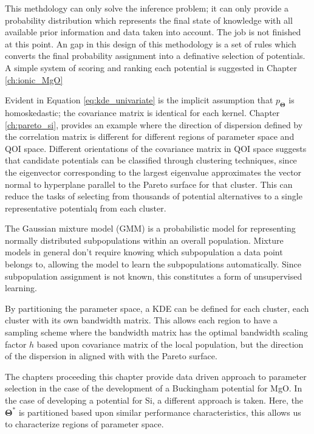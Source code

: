 This methdology can only solve the inference problem; it can only provide a probability distribution which represents the final state of knowledge with all available prior information and data taken into account.  The job is not finished at this point.  An gap in this design of this methodology is a set of rules which converts the final probability assignment into a definative selection of potentials.  A simple system of scoring and ranking each potential is suggested in Chapter \ref{ch:ionic_MgO}

Evident in Equation \ref{eq:kde_univariate} is the implicit assumption that $p_{\bm{\Theta}}$ is homoskedastic; the covariance matrix is identical for each kernel.  Chapter \ref{ch:pareto_si}, provides an example where the direction of dispersion defined by the correlation matrix is different for different regions of parameter space and QOI space.  Different orientations of the covariance matrix in QOI space suggests that candidate potentials can be classified through clustering techniques, since the eigenvector corresponding to the largest eigenvalue approximates the vector normal to hyperplane parallel to the Pareto surface for that cluster.  This can reduce the tasks of selecting from thousands of potential alternatives to a single representative potentialq from each cluster.

The Gaussian mixture model (GMM) is a probabilistic model for representing normally distributed subpopulations within an overall population. Mixture models in general don't require knowing which subpopulation a data point belongs to, allowing the model to learn the subpopulations automatically. Since subpopulation assignment is not known, this constitutes a form of unsupervised learning.

By partitioning the parameter space, a KDE can be defined for each cluster, each cluster with its own bandwidth matrix.  This allows each region to have a sampling scheme where the bandwidth matrix has the optimal bandwidth scaling factor $h$ based upon covariance matrix of the local population, but the direction of the dispersion in aligned with with the Pareto surface.

The chapters proceeding this chapter provide data driven approach to parameter selection in the case of the development of a Buckingham potential for MgO.  In the case of developing a potential for Si, a different approach is taken.  Here, the $\bm{\Theta}^*$ is partitioned based upon similar performance characteristics, this allows us to characterize regions of parameter space.
